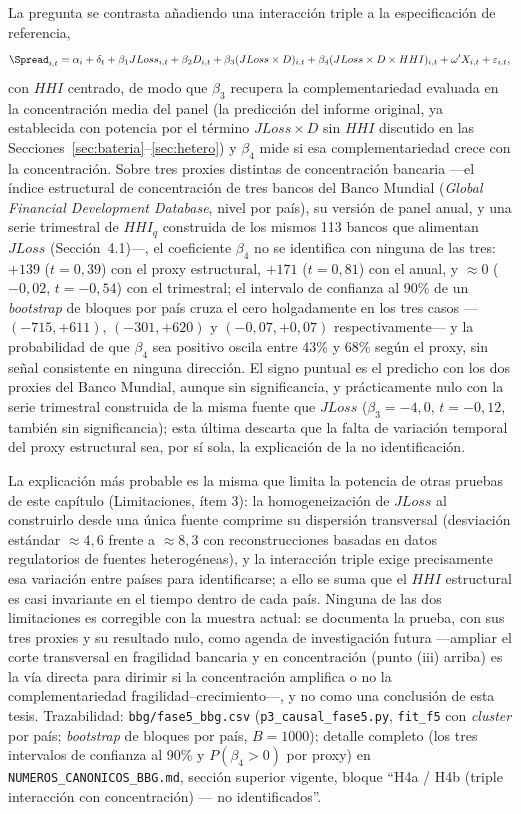 La pregunta se contrasta añadiendo una interacción triple a la especificación de referencia,
\[
\Spread_{i,t} = \alpha_i + \delta_t + \beta_1 JLoss_{i,t} + \beta_2 D_{i,t} + \beta_3(JLoss\times D)_{i,t} + \beta_4(JLoss\times D\times HHI)_{i,t} + \omega'X_{i,t} + \varepsilon_{i,t},
\]
con $HHI$ centrado, de modo que $\beta_3$ recupera la complementariedad evaluada en la concentración media del panel (la predicción del informe original, ya establecida con potencia por el término $JLoss\times D$ sin $HHI$ discutido en las Secciones~\ref{sec:bateria}--\ref{sec:hetero}) y $\beta_4$ mide si esa complementariedad crece con la concentración. Sobre tres proxies distintas de concentración bancaria —el índice estructural de concentración de tres bancos del Banco Mundial (\textit{Global Financial Development Database}, nivel por país), su versión de panel anual, y una serie trimestral de $HHI_q$ construida de los mismos 113 bancos que alimentan $JLoss$ (Sección~4.1)—, el coeficiente $\beta_4$ no se identifica con ninguna de las tres: $+139$ ($t=0{,}39$) con el proxy estructural, $+171$ ($t=0{,}81$) con el anual, y $\approx0$ ($-0{,}02$, $t=-0{,}54$) con el trimestral; el intervalo de confianza al 90\% de un \textit{bootstrap} de bloques por país cruza el cero holgadamente en los tres casos —$(-715,+611)$, $(-301,+620)$ y $(-0{,}07,+0{,}07)$ respectivamente— y la probabilidad de que $\beta_4$ sea positivo oscila entre 43\% y 68\% según el proxy, sin señal consistente en ninguna dirección. El signo puntual es el predicho con los dos proxies del Banco Mundial, aunque sin significancia, y prácticamente nulo con la serie trimestral construida de la misma fuente que $JLoss$ ($\beta_3=-4{,}0$, $t=-0{,}12$, también sin significancia); esta última descarta que la falta de variación temporal del proxy estructural sea, por sí sola, la explicación de la no identificación.

La explicación más probable es la misma que limita la potencia de otras pruebas de este capítulo (Limitaciones, ítem 3): la homogeneización de $JLoss$ al construirlo desde una única fuente comprime su dispersión transversal (desviación estándar $\approx4{,}6$ frente a $\approx8{,}3$ con reconstrucciones basadas en datos regulatorios de fuentes heterogéneas), y la interacción triple exige precisamente esa variación entre países para identificarse; a ello se suma que el $HHI$ estructural es casi invariante en el tiempo dentro de cada país. Ninguna de las dos limitaciones es corregible con la muestra actual: se documenta la prueba, con sus tres proxies y su resultado nulo, como agenda de investigación futura —ampliar el corte transversal en fragilidad bancaria y en concentración (punto (iii) arriba) es la vía directa para dirimir si la concentración amplifica o no la complementariedad fragilidad--crecimiento—, y no como una conclusión de esta tesis. Trazabilidad: \texttt{bbg/fase5\_bbg.csv} (\texttt{p3\_causal\_fase5.py}, \texttt{fit\_f5} con \textit{cluster} por país; \textit{bootstrap} de bloques por país, $B=1000$); detalle completo (los tres intervalos de confianza al 90\% y $P(\beta_4>0)$ por proxy) en \texttt{NUMEROS\_CANONICOS\_BBG.md}, sección superior vigente, bloque ``H4a / H4b (triple interacción con concentración) — no identificados''.

